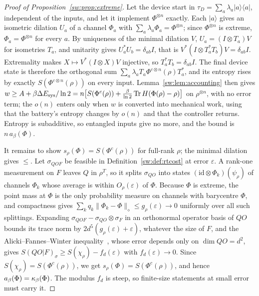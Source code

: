 \begin{proof}[Proof of Proposition~\ref{sw:prop:extreme}]
Let the device start in $\tau_D=\sum_a\lambda_a|a\rangle\langle a|$, independent of the inputs, and let it implement $\Phi^{\otimes n}$ exactly. Each $|a\rangle$ gives an isometric dilation $U_a$ of a channel $\Phi_a$ with $\sum_a\lambda_a\Phi_a=\Phi^{\otimes n}$; since $\Phi^{\otimes n}$ is extreme, $\Phi_a=\Phi^{\otimes n}$ for every $a$. By uniqueness of the minimal dilation $V$, $U_a=(I\otimes T_a)V$ for isometries $T_a$, and unitarity gives $U_a^*U_b=\delta_{ab}I$, that is $V^*(I\otimes T_a^*T_b)V=\delta_{ab}I$. Extremality makes $X\mapsto V^*(I\otimes X)V$ injective, so $T_a^*T_b=\delta_{ab}I$. The final device state is therefore the orthogonal sum $\sum_a\lambda_aT_a\Phi^{c\otimes n}(\rho)T_a^*$, and its entropy rises by exactly $S(\Phi^{c\otimes n}(\rho))$ on every input. Lemma~\ref{sw:lem:accounting} then gives $w\ge A+\beta\Delta E_{\mathrm{sys}}/\ln2=n\bigl[S(\Phi^c(\rho))+\tfrac{\beta}{\ln2}\operatorname{Tr} H(\Phi(\rho)-\rho)\bigr]$ on $\rho^{\otimes n}$, with no error term; the $o(n)$ enters only when $w$ is converted into mechanical work, using that the battery's entropy changes by $o(n)$ and that the controller returns. Entropy is subadditive, so entangled inputs give no more, and the bound is $n\,a_\beta(\Phi)$.

It remains to show $s_\rho(\Phi)=S(\Phi^c(\rho))$ for full-rank $\rho$; the minimal dilation gives $\le$. Let $\sigma_{QOF}$ be feasible in Definition~\ref{sw:def:rtcost} at error $\varepsilon$. A rank-one measurement on $F$ leaves $Q$ in $\rho^T$, so it splits $\sigma_{QO}$ into states $(\mathrm{id}\otimes\Phi_k)(\psi_\rho)$ of channels $\Phi_k$ whose average is within $O_\rho(\varepsilon)$ of $\Phi$. Because $\Phi$ is extreme, the point mass at $\Phi$ is the only probability measure on channels with barycentre $\Phi$, and compactness gives $\sum_kq_k\|\Phi_k-\Phi\|_\diamond\le g_\rho(\varepsilon)\to0$ uniformly over all such splittings. Expanding $\sigma_{QOF}-\sigma_{QO}\otimes\sigma_F$ in an orthonormal operator basis of $QO$ bounds its trace norm by $2d^5(g_\rho(\varepsilon)+\varepsilon)$, whatever the size of $F$, and the Alicki--Fannes--Winter inequality~\cite{Winter16}, whose error depends only on $\dim QO=d^2$, gives $S(QO|F)_\sigma\ge S(\chi_\rho)-f_d(\varepsilon)$ with $f_d(\varepsilon)\to0$. Since $S(\chi_\rho)=S(\Phi^c(\rho))$, we get $s_\rho(\Phi)=S(\Phi^c(\rho))$, and hence $a_\beta(\Phi)=\kappa_\beta(\Phi)$. The modulus $f_d$ is steep, so finite-size statements at small error must carry it.
\end{proof}

